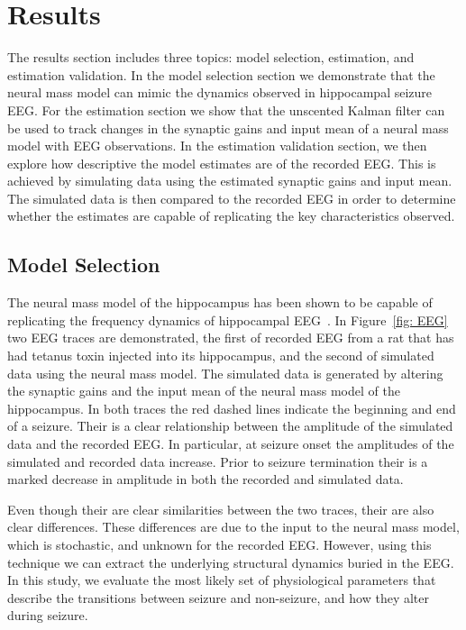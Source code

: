 \section{Results}

The results section includes three topics: model selection, estimation, and estimation validation. In the model selection section we demonstrate that the neural mass model can mimic the dynamics observed in hippocampal seizure EEG. For the estimation section we show that the unscented Kalman filter can be used to track changes in the synaptic gains and input mean of a neural mass model with EEG observations. In the estimation validation section, we then explore how descriptive the model estimates are of the recorded EEG. This is achieved by simulating data using the estimated synaptic gains and input mean. The simulated data is then compared to the recorded EEG in order to determine whether the estimates are capable of replicating the key characteristics observed.

\subsection{Model Selection}

The neural mass model of the hippocampus has been shown to be capable of replicating the frequency dynamics of hippocampal EEG~\citep{wendling2002epileptic}. In Figure~\ref{fig: EEG} two EEG traces are demonstrated, the first of recorded EEG from a rat that has had tetanus toxin injected into its hippocampus, and the second of simulated data using the neural mass model. The simulated data is generated by altering the synaptic gains and the input mean of the neural mass model of the hippocampus. In both traces the red dashed lines indicate the beginning and end of a seizure. Their is a clear relationship between the amplitude of the simulated data and the recorded EEG. In particular, at seizure onset the amplitudes of the simulated and recorded data increase. Prior to seizure termination their is a marked decrease in amplitude in both the recorded and simulated data.
 
Even though their are clear similarities between the two traces, their are also clear differences. These differences are due to the input to the neural mass model, which is stochastic, and unknown for the recorded EEG. However, using this technique we can extract the underlying structural dynamics buried in the EEG. In this study, we evaluate the most likely set of physiological parameters that describe the transitions between seizure and non-seizure, and how they alter during seizure.

